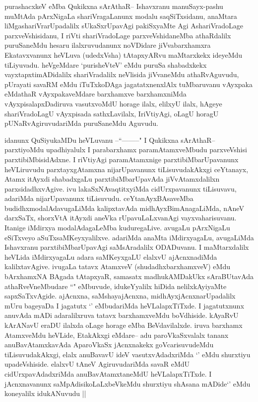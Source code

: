 \begin{artha}
purashacxkeV eMba Qukikxna sArAthaR-- Ishavxranu manuSayx-pashu muMtAda pArxNigaLa shariVragaLanunx modalu saqSiTxsidanu, anaMtara liMgashariVrarUpadalilx sUkaSxrUpavAgi pakiSxyaMte Agi AshariVradoLage parxveVshisidanu, I riVti shariVradoLage parxveVshidaneMba athaRdalilx puruSaneMdu hesaru ilalxruvudanunx noVDidare jiVvabarxhamxra Ekatavxvanunx heVLuva (udedxVsha) tAtapxyARvu maMtarxkekx ideyeMdu tiLiyuvadu. heVgeMdare `purisheVteV' eMdu puruSa shabadxkekx vayxtapxtimADidalilx shariVradalilx neVlisida jiVvaneMdu athaRvAguvudu, pUrayati savaRM eMdu iTuTxkoDAga jagatatxnenxlAlx tuMbaruvanu vAyxpaka eMdathaR vAyxpakaveMdare barxhamxve barxhamxniMda vAyxpisalapxDadiruva vasutxvoMdU horage ilalx, elilxyU ilalx, hAgeye shariVradoLagU vAyxpisada sathxLavilalx, IriVtiyAgi, oLagU horagU pUNaRvAgiruvudariMda puruSaneMdu Aguvudu.

idanunx  QuSiyukaMDu heVLuvanu --``\stext--------" I Qukikxna sArAthaR-- parxtiyoMdu upadhiyalulx I parabarxhamx paramAtamxveMbudu parxveVshisi parxtibiMbisidAdxne. I riVtiyAgi paramAtamxnige parxtibiMbarUpavanunx heVLiruvudu parxtayxgAtamxna nijarUpavanunx tiLisuvudakAkxgi ceYtanayx, Atamx itAyxdi shabadxgaLu parxtibiMbarUpavAda jiVvAtamxdalilxn parxsidadhxvAgive. ivu lakaSxNAvaqtitxyiMda cidUrxpavanunx tiLisuvavu, adariMda nijarUpavanunx tiLisuvudu. ceYtanAyxBAsaveMba budidhxmodalAdavugaLiMda kalipxtavAda midhAyxBimAnagaLiMda, nAneV darxSaTx, shorxVtA itAyxdi aneVka rUpavuLaLxvanAgi vayxvaharisuvanu. Itanige iMdirxya modalAdagaLeMba kuduregaLive. avugaLu pArxNigaLu eSiTxveyo aSuTxsaMKeyxyalilxve. adariMda anaMta iMdirxyagaLu, avugaLiMda Ishavxranu parxtibiMbarUpavAgi saMsAradalilx ODADuvanu. I maMtarxdalilx heVLida iMdirxyagaLu adara saMKeyxgaLU elalxvU ajAcnxnadiMda kalilxtavAgive. ivugaLa tatavx AtamxveV (shudadhxbarxhamxveV) eMdu bArxhamxNA BAgada tAtapxyaR, samasatx madhukAMDakUkx sAraBUtavAda athaRveVneMbudare ``\stext" eMbuvude, idukeYyalilx hiDida nelilxkAyiyaMte sapxSaTxvAgide. ajAcnxna, saMshayajAcnxna, midhAyxjAcnxnarUpadalilx mUru bageyaDa I jagatutx `\stext' eMbudariMda heVLalapxTiTxde. I jagatutxnunx anuvAda mADi adaralilxruva tatavx barxhamxveMdu boVdhiside. kAyaRvU kArANavU eraDU ilalxda oLage horage eMba BeVdavilalxde. iruva barxhamx AtamxveMdu heVLide, EtakAkxgi eMdare-- adu paroVkaSxvalalx tananx anuBavAtamxkavAda AparoVkaSx jAcnxnakekx goVcarisuvudeMdu tiLisuvudakAkxgi, elalx anuBavavU ideV vasutxvAdadxriMda `\stext' eMdu shurxtiyu upadeVshiside. elalxvU tAneV AgiruvudariMda savaR eMdU cidUrxpavAdadxriMda anuBavAtamxtaneMdU heVLalapxTiTxde. I jAcnxnavanunx saMpAdisikoLaLxbeVkeMdu shurxtiyu shAsana mADide`\stext' eMdu koneyalilx idukANuvudu ||
\end{artha}

